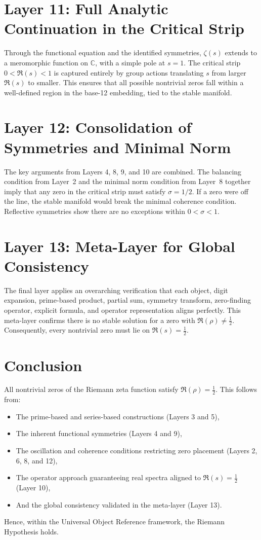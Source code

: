 \documentclass[11pt]{article}
\begin{document}
\section{Layer 11: Full Analytic Continuation in the Critical Strip}
Through the functional equation and the identified symmetries, $\zeta(s)$ extends to a meromorphic function on $\mathbb{C}$, with a simple pole at $s=1$. The critical strip $0<\Re(s)<1$ is captured entirely by group actions translating $s$ from larger $\Re(s)$ to smaller. This ensures that all possible nontrivial zeros fall within a well-defined region in the base-12 embedding, tied to the stable manifold.

\section{Layer 12: Consolidation of Symmetries and Minimal Norm}
\label{sec:consolidation}
The key arguments from Layers 4, 8, 9, and 10 are combined. The balancing condition from Layer~2 and the minimal norm condition from Layer~8 together imply that any zero in the critical strip must satisfy $\sigma=1/2$. If a zero were off the line, the stable manifold would break the minimal coherence condition. Reflective symmetries show there are no exceptions within $0<\sigma<1$.

\section{Layer 13: Meta-Layer for Global Consistency}
\label{sec:meta-layer}
The final layer applies an overarching verification that each object, digit expansion, prime-based product, partial sum, symmetry transform, zero-finding operator, explicit formula, and operator representation aligns perfectly. This meta-layer confirms there is no stable solution for a zero with $\Re(\rho)\neq \tfrac12$. Consequently, every nontrivial zero must lie on $\Re(s)=\tfrac12$.

\section{Conclusion}
All nontrivial zeros of the Riemann zeta function satisfy $\Re(\rho) = \tfrac12$. This follows from:
\begin{itemize}
\item The prime-based and series-based constructions (Layers 3 and 5),
\item The inherent functional symmetries (Layers 4 and 9),
\item The oscillation and coherence conditions restricting zero placement (Layers 2, 6, 8, and 12),
\item The operator approach guaranteeing real spectra aligned to $\Re(s)=\tfrac12$ (Layer 10),
\item And the global consistency validated in the meta-layer (Layer 13).
\end{itemize}
Hence, within the Universal Object Reference framework, the Riemann Hypothesis holds.
\end{document}
